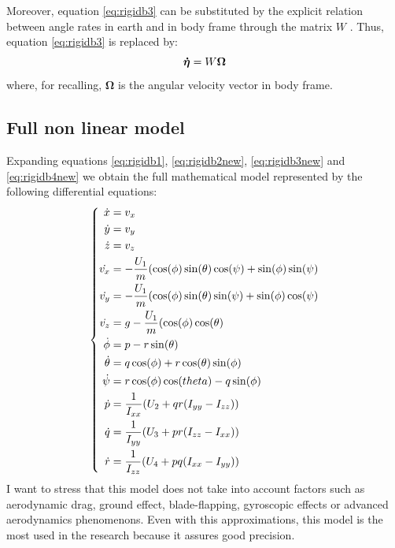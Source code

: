 \noindent
Moreover, equation \eqref{eq:rigidb3} can be substituted by the explicit relation between angle rates in earth and in body frame through the matrix $W$ \cite{Kendoul2007}. Thus, equation \eqref{eq:rigidb3} is replaced by:
\vspace{1ex}
\begin{equation}
\vspace{1ex}
\boldsymbol{\dot{\eta}} = W\boldsymbol{\Omega}
\label{eq:rigidb3new}
\end{equation}
where, for recalling, $\boldsymbol{\Omega}$ is the angular velocity vector in body frame.

\subsection*{Full non linear model}
Expanding equations \eqref{eq:rigidb1}, \eqref{eq:rigidb2new}, \eqref{eq:rigidb3new} and \eqref{eq:rigidb4new} we obtain the full mathematical model represented by the following differential equations:
\vspace{2ex}
\begin{equation}
\vspace{2ex}
\left\lbrace
	\begin{aligned}
		\dot{x}& = v_x \\
		\dot{y}& = v_y \\
		\dot{z}& = v_z \\
		\dot{v_x}& = -\frac{U_1}{m}(\cos(\phi)\sin(\theta)\cos(\psi) + \sin(\phi)\sin(\psi) \\
		\dot{v_y}& = -\frac{U_1}{m}(\cos(\phi)\sin(\theta)\sin(\psi) + \sin(\phi)\cos(\psi) \\
		\dot{v_z}& = g - \frac{U_1}{m}(\cos(\phi)\cos(\theta) \\
        \dot{\phi}& = p - r \sin(\theta) \\
        \dot{\theta}& = q \cos(\phi) + r\cos(\theta) \sin(\phi) \\
        \dot{\psi}& = r \cos(\phi) \cos(theta) - q \sin(\phi)\\
        \dot{p}& =\frac{1}{I_{xx}}(U_2 + qr(I_{yy} - I_{zz})) \\
        \dot{q}& =\frac{1}{I_{yy}}(U_3 + pr(I_{zz} - I_{xx})) \\
        \dot{r}& =\frac{1}{I_{zz}}(U_4 + pq(I_{xx} - I_{yy})) \\
     \end{aligned}
     \right.
\label{eq:mathfullmodel}
\end{equation}
I want to stress that this model does not take into account factors such as aerodynamic drag, ground effect, blade-flapping, gyroscopic effects or advanced aerodynamics phenomenons. Even with this approximations, this model is the most used in the research because it assures good precision.

